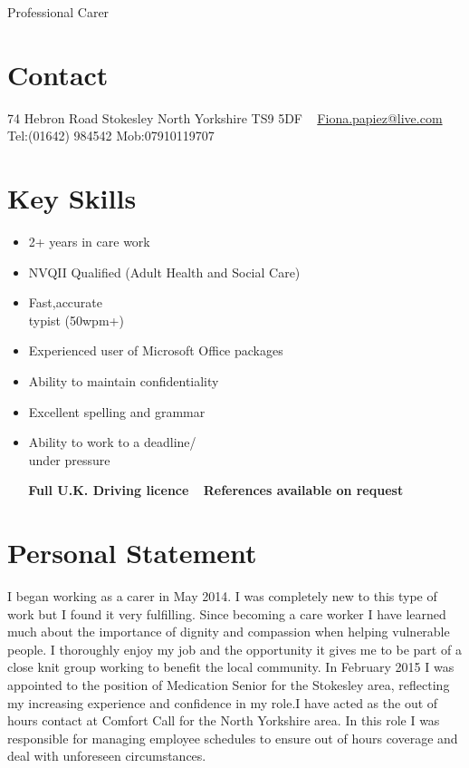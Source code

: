 \documentclass[]{friggeri-cv}
\begin{document}
       {Professional Carer}
       {}


\begin{aside}
  \section{Contact}
    74 Hebron Road
    Stokesley
    North Yorkshire
    TS9 5DF
    ~
    \href{mailto:Fiona.papiez@live.com}{Fiona.papiez@live.com}
    ~
    Tel:(01642) 984542
    Mob:07910119707
    ~
  \section{Key Skills}
   \begin{itemize}
   \item 2+ years in care work
   \item NVQII Qualified (Adult Health and Social Care)
   \item Fast,accurate \\ typist (50wpm+)
   \item Experienced user of Microsoft Office packages
   \item Ability to maintain confidentiality
   \item Excellent spelling and grammar
   \item Ability to work to a deadline/ \\ under pressure
   \end{itemize}
   ~
   ~
   \textbf{Full U.K. Driving licence}
   ~
   \textbf{References available on request}
\end{aside}

\section{Personal Statement}

I began working as a carer in May 2014. I was completely new to this type of work but I found it very fulfilling. Since becoming a care worker I have learned much about the importance of dignity and compassion when helping vulnerable people. I thoroughly enjoy my job and the opportunity it gives me to be part of a close knit group working to benefit the local community.  In February 2015 I was appointed to the position of Medication Senior for the Stokesley area, reflecting my increasing experience and confidence in my role.I have acted as the out of hours contact at Comfort Call for the North Yorkshire area. In this role I was responsible for managing employee schedules to ensure out of hours coverage and deal with unforeseen circumstances.   
\end{document}
